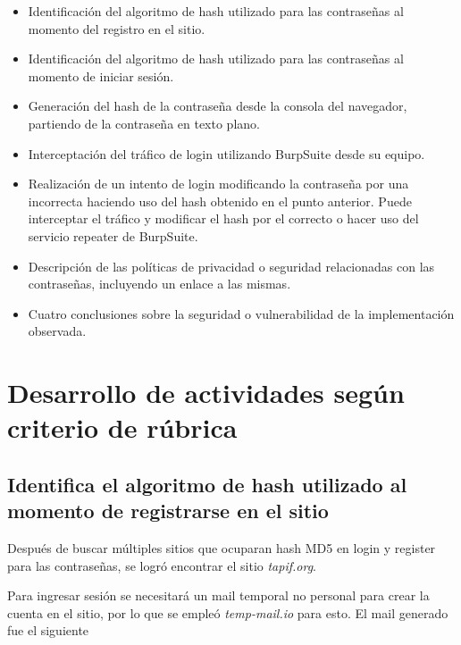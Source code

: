 \documentclass[letter,12pt]{article}
\begin{document}
\begin{itemize}
    \item Identificación del algoritmo de hash utilizado para las contraseñas al momento del registro en el sitio.
    
    \item Identificación del algoritmo de hash utilizado para las contraseñas al momento de iniciar sesión.

    \item Generación del hash de la contraseña desde la consola del navegador, partiendo de la contraseña en texto plano.

    \item Interceptación del tráfico de login utilizando BurpSuite desde su equipo.

    \item Realización de un intento de login modificando la contraseña por una incorrecta haciendo uso del hash obtenido en el punto anterior. Puede interceptar el tráfico y modificar el hash por el correcto o hacer uso del servicio repeater de BurpSuite.

    \item Descripción de las políticas de privacidad o seguridad relacionadas con las contraseñas, incluyendo un enlace a las mismas.

    \item Cuatro conclusiones sobre la seguridad o vulnerabilidad de la implementación observada.
    


    
\end{itemize}

\section{Desarrollo de actividades según criterio de rúbrica}

\subsection{Identifica el algoritmo de hash utilizado al momento de registrarse en el sitio}

Después de buscar múltiples sitios que ocuparan hash MD5 en login y register para las contraseñas, se logró encontrar el sitio \textit{tapif.org}. 

Para ingresar sesión se necesitará un mail temporal no personal para crear la cuenta en el sitio, por lo que se empleó \textit{temp-mail.io} para esto. El mail generado fue el siguiente
\end{document}
